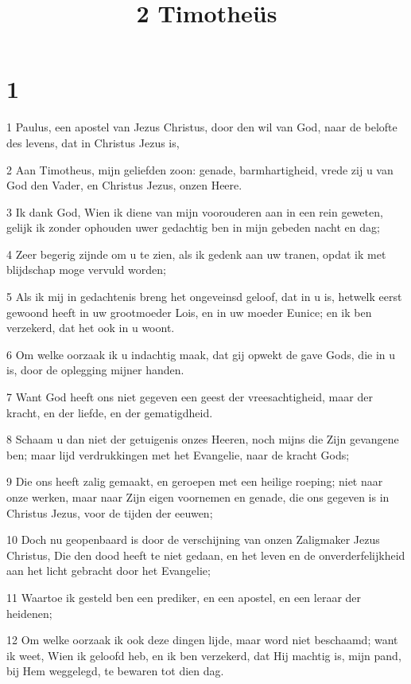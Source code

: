 

\title{2 Timotheüs}



\chapter{1}

\par 1 Paulus, een apostel van Jezus Christus, door den wil van God, naar de belofte des levens, dat in Christus Jezus is,
\par 2 Aan Timotheus, mijn geliefden zoon: genade, barmhartigheid, vrede zij u van God den Vader, en Christus Jezus, onzen Heere.
\par 3 Ik dank God, Wien ik diene van mijn voorouderen aan in een rein geweten, gelijk ik zonder ophouden uwer gedachtig ben in mijn gebeden nacht en dag;
\par 4 Zeer begerig zijnde om u te zien, als ik gedenk aan uw tranen, opdat ik met blijdschap moge vervuld worden;
\par 5 Als ik mij in gedachtenis breng het ongeveinsd geloof, dat in u is, hetwelk eerst gewoond heeft in uw grootmoeder Lois, en in uw moeder Eunice; en ik ben verzekerd, dat het ook in u woont.
\par 6 Om welke oorzaak ik u indachtig maak, dat gij opwekt de gave Gods, die in u is, door de oplegging mijner handen.
\par 7 Want God heeft ons niet gegeven een geest der vreesachtigheid, maar der kracht, en der liefde, en der gematigdheid.
\par 8 Schaam u dan niet der getuigenis onzes Heeren, noch mijns die Zijn gevangene ben; maar lijd verdrukkingen met het Evangelie, naar de kracht Gods;
\par 9 Die ons heeft zalig gemaakt, en geroepen met een heilige roeping; niet naar onze werken, maar naar Zijn eigen voornemen en genade, die ons gegeven is in Christus Jezus, voor de tijden der eeuwen;
\par 10 Doch nu geopenbaard is door de verschijning van onzen Zaligmaker Jezus Christus, Die den dood heeft te niet gedaan, en het leven en de onverderfelijkheid aan het licht gebracht door het Evangelie;
\par 11 Waartoe ik gesteld ben een prediker, en een apostel, en een leraar der heidenen;
\par 12 Om welke oorzaak ik ook deze dingen lijde, maar word niet beschaamd; want ik weet, Wien ik geloofd heb, en ik ben verzekerd, dat Hij machtig is, mijn pand, bij Hem weggelegd, te bewaren tot dien dag.
